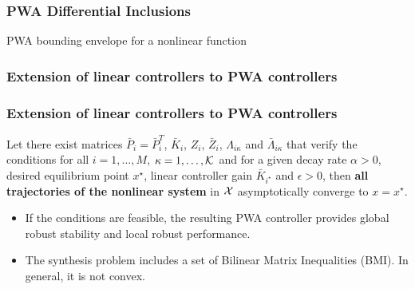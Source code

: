 \documentclass{beamer}
\newcommand{\KA}{{\cal K}}
\begin{document}
  \frame
  {
    \frametitle{PWA Differential Inclusions}
\centerline{PWA bounding envelope for a nonlinear function}  
\centerline{}
}

  \frame
  {
    \frametitle{Extension of linear controllers to PWA controllers}
    \centerline{}
  }

  \frame
  {
    \frametitle{Extension of linear controllers to PWA controllers}
\begin{theorem}[3.2]
Let there exist matrices $\bar P_i=\bar P_i^T$, $\bar K_i$, $Z_i$, $\bar Z_i$, $\Lambda_{i\kappa}$ and $\bar \Lambda_{i\kappa}$ that verify the conditions for all $i=1,\ldots,M$, $\kappa=1,\ldots,\KA$ and for a given decay rate $\alpha>0$, desired equilibrium point $x^\star$, linear controller gain $\bar K_{i^\star}$ and $\epsilon>0$, then \textbf{all trajectories of the nonlinear system} in $\cal X$ asymptotically converge to $x=x^\star$.
\end{theorem}
\begin{itemize}
\item<2-> If the conditions are feasible, the resulting PWA controller provides global robust stability and local robust performance.
\item<3-> The synthesis problem includes a set of Bilinear Matrix Inequalities (BMI). In general, it is not convex.
\end{itemize}
}  
 
\end{document}
